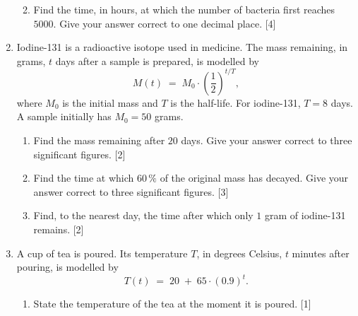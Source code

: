 \documentclass[12pt, twoside]{article}
\begin{document}
\begin{enumerate}[itemsep=0.4cm]
\begin{enumerate}[itemsep=0.4cm]
  \vspace{4.5cm}

  \item Find the time, in hours, at which the number of bacteria first
  reaches $5000$. Give your answer correct to one decimal place.
  \hfill [4]

  \vspace{5cm}
\end{enumerate}

\newpage

\item[3.] [Maximum mark: 7]

Iodine-131 is a radioactive isotope used in medicine. The mass
remaining, in grams, $t$ days after a sample is prepared, is modelled by
$$M(t) \;=\; M_0 \cdot \left(\dfrac{1}{2}\right)^{t/T},$$
where $M_0$ is the initial mass and $T$ is the half-life. For
iodine-131, $T = 8$ days. A sample initially has $M_0 = 50$ grams.

\begin{enumerate}[itemsep=0.4cm]
  \item Find the mass remaining after $20$ days. Give your answer
  correct to three significant figures. \hfill [2]

  \vspace{4.5cm}

  \item Find the time at which $60\,\%$ of the original mass has decayed.
  Give your answer correct to three significant figures. \hfill [3]

  \vspace{5cm}

  \item Find, to the nearest day, the time after which only $1$ gram of
  iodine-131 remains. \hfill [2]

  \vspace{3cm}
\end{enumerate}

\newpage

\item[4.] [Maximum mark: 6]

A cup of tea is poured. Its temperature $T$, in degrees Celsius,
$t$ minutes after pouring, is modelled by
$$T(t) \;=\; 20 \;+\; 65 \cdot (0.9)^t.$$

\begin{enumerate}[itemsep=0.4cm]
  \item State the temperature of the tea at the moment it is poured.
  \hfill [1]


\end{enumerate}
\end{enumerate}
\end{document}
